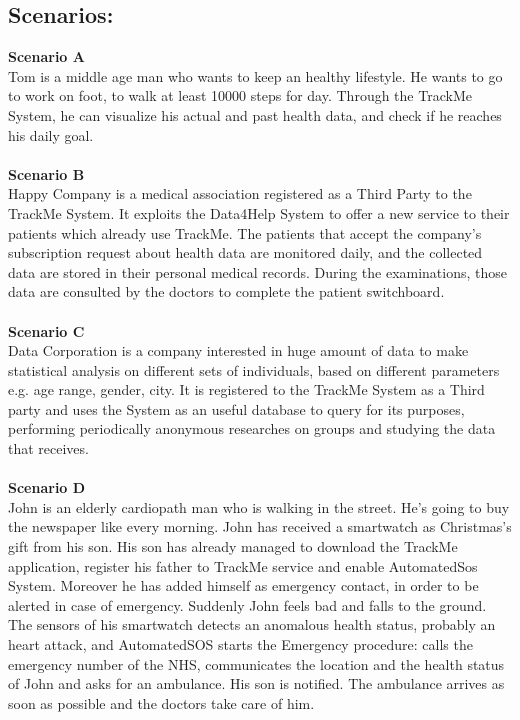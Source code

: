 \subsection{Scenarios:}
\textbf{Scenario A} \\ 
    Tom is a middle age man who wants to keep an healthy lifestyle. He  wants to go to work on foot, to walk at least 10000 steps for day. Through the TrackMe System, he can visualize his actual and past health data, and check if he reaches his daily goal. \\ \\
\textbf{Scenario B} \\ 
    Happy Company is a medical association registered as a Third Party to the TrackMe System. It exploits the Data4Help System to offer a new service to their patients which already use TrackMe. The patients that accept the company's subscription request about health data are monitored daily, and the collected data are stored in their personal medical records. During the examinations, those data are consulted by the doctors to complete the patient switchboard. \\ \\
\textbf{Scenario C} \\ 
    Data Corporation is a company interested in huge amount of data to make statistical analysis on different sets of individuals, based on different parameters e.g. age range, gender, city. It is registered to the TrackMe System as a Third party and uses the System as an useful database to query for its purposes, performing periodically anonymous researches on groups and studying the data that receives. \\ \\
\textbf{Scenario D} \\ 
    John is an elderly cardiopath man who is walking in the street. He's going to buy the newspaper like every morning.
    John has received a smartwatch as Christmas's gift from his son. His son has already managed to download the TrackMe application, register his father to TrackMe service and enable AutomatedSos System. Moreover he has added himself as emergency contact, in order to be alerted in case of emergency.
    Suddenly John feels bad and falls to the ground. The sensors of his smartwatch detects an anomalous health status, probably an heart attack, and AutomatedSOS starts the Emergency procedure: calls the emergency number of the NHS, communicates the location and the health status of John and asks for an ambulance. His son is notified. The ambulance arrives as soon as possible and the doctors take care of him. \\ \\
